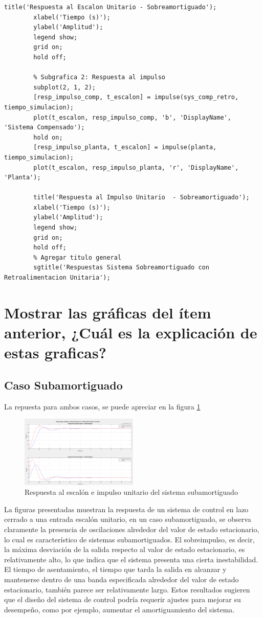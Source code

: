 \documentclass[conference]{IEEEtran}
\begin{document}
\begin{lstlisting}[numbers=none]
		title('Respuesta al Escalon Unitario - Sobreamortiguado');
		xlabel('Tiempo (s)');
		ylabel('Amplitud');
		legend show;
		grid on; 
		hold off;
		
		% Subgrafica 2: Respuesta al impulso 
		subplot(2, 1, 2); 
		[resp_impulso_comp, t_escalon] = impulse(sys_comp_retro, tiempo_simulacion);
		plot(t_escalon, resp_impulso_comp, 'b', 'DisplayName', 'Sistema Compensado');
		hold on;
		[resp_impulso_planta, t_escalon] = impulse(planta, tiempo_simulacion);
		plot(t_escalon, resp_impulso_planta, 'r', 'DisplayName', 'Planta');
		
		title('Respuesta al Impulso Unitario  - Sobreamortiguado');
		xlabel('Tiempo (s)');
		ylabel('Amplitud'); 
		legend show;
		grid on; 
		hold off;
		% Agregar titulo general 
		sgtitle('Respuestas Sistema Sobreamortiguado con Retroalimentacion Unitaria');
	\end{lstlisting}
	
	\section{Mostrar las gráficas del ítem anterior, ¿Cuál es la explicación de estas graficas?}
	
	\subsection{Caso Subamortiguado}
	La repuesta para ambos casos, se puede apreciar en la figura \ref{fig:respuesta-sub}
	\begin{figure}[h]
		\centering
		\includegraphics[width=0.5\textwidth]{media/respuesta-sub}
		\caption{Respuesta al escalón e impulso unitario del sistema subamortiguado}
		\label{fig:respuesta-sub}
	\end{figure}
	
	La figuras presentadas muestran la respuesta de un sistema de control en lazo cerrado a una entrada escalón unitario, en un caso subamortiguado, se observa claramente la presencia de oscilaciones alrededor del valor de estado estacionario, lo cual es característico de sistemas subamortiguados. El sobreimpulso, es decir, la máxima desviación de la salida respecto al valor de estado estacionario, es relativamente alto, lo que indica que el sistema presenta una cierta inestabilidad. El tiempo de asentamiento, el tiempo que tarda la salida en alcanzar y mantenerse dentro de una banda especificada alrededor del valor de estado estacionario, también parece ser relativamente largo. Estos resultados sugieren que el diseño del sistema de control podría requerir ajustes para mejorar su desempeño, como por ejemplo, aumentar el amortiguamiento del sistema.
	
\end{document}
